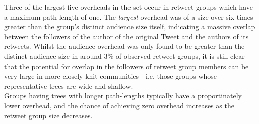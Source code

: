 Three of the largest five overheads in the set occur in retweet groups which have a maximum path-length of one. The \textit{largest} overhead was of a size over six times greater than the group's distinct audience size itself, indicating a massive overlap between the followers of the author of the original Tweet and the authors of its retweets. Whilst the audience overhead was only found to be greater than the distinct audience size in around 3\% of observed retweet groups, it is still clear that the potential for overlap in the followers of retweet group members can be very large in more closely-knit communities - i.e. those groups whose representative trees are wide and shallow.\\
Groups having trees with longer path-lengths typically have a proportinately lower overhead, and the chance of achieving zero overhead increases as the retweet group size decreases.

